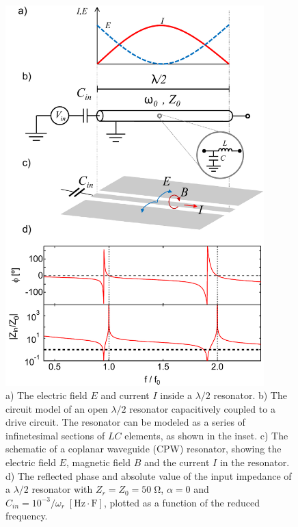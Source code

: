 \begin{figure}
	\includegraphics[width=10cm]{"./material/mathematica/cpw_lambda_over_4_phase_and_z_with_schematic"}
	\caption{a) The electric field $E$ and current $I$ inside a $\lambda/2$ resonator. b) The circuit model of an open $\lambda/2$ resonator capacitively coupled to a drive circuit. The resonator can be modeled as a series of infinetesimal sections of $LC$ elements, as shown in the inset. c) The schematic of a coplanar waveguide (CPW) resonator, showing the electric field $E$, magnetic field $B$ and the current $I$ in the resonator. d) The reflected phase and absolute value of the input impedance of a $\lambda/2$ resonator with $Z_r=Z_0=50\;\mathrm{\Omega}$, $\alpha=0$ and $C_{in}=10^{-3}/\omega_r\;[\mathrm{Hz}\cdot\mathrm{F}]$, plotted as a function of the reduced frequency.}
	\label{fig:lambda_over_2_response}
\end{figure}

